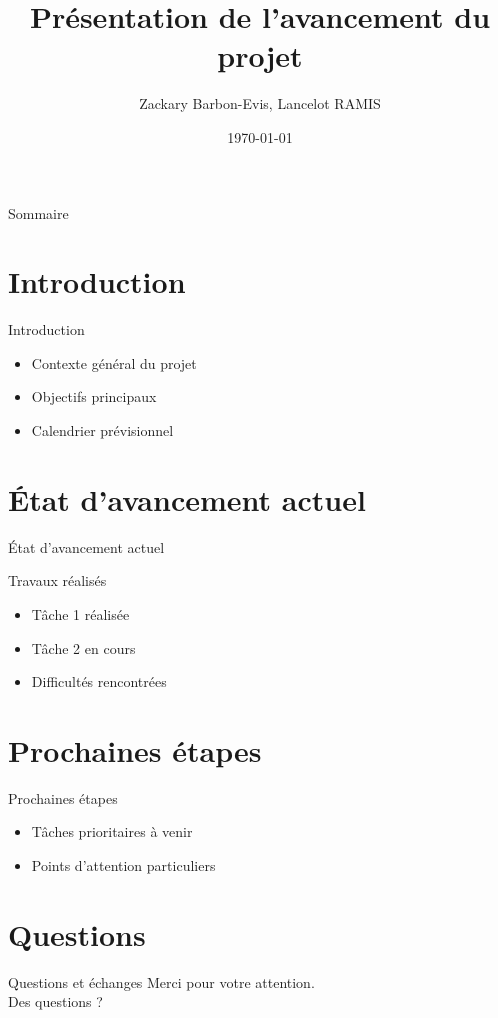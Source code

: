 \documentclass{beamer}
\title[Avancement Projet Info]{Présentation de l'avancement du projet}
\author{Zackary Barbon-Evis, Lancelot RAMIS}
\date{\today}
\begin{document}
\frame{\titlepage}

\begin{frame}{Sommaire}
    \tableofcontents
\end{frame}

\section{Introduction}

\begin{frame}{Introduction}
    \begin{itemize}
        \item Contexte général du projet
        \item Objectifs principaux
        \item Calendrier prévisionnel
    \end{itemize}
\end{frame}

\section{État d'avancement actuel}

\begin{frame}{État d'avancement actuel}
    \begin{block}{Travaux réalisés}
        \begin{itemize}
            \item Tâche 1 réalisée
            \item Tâche 2 en cours
            \item Difficultés rencontrées
        \end{itemize}
    \end{block}
\end{frame}

\section{Prochaines étapes}

\begin{frame}{Prochaines étapes}
    \begin{itemize}
        \item Tâches prioritaires à venir
        \item Points d'attention particuliers
    \end{itemize}
\end{frame}

\section{Questions}

\begin{frame}{Questions et échanges}
    \centering
    Merci pour votre attention.\\[1cm]
    Des questions ?
\end{frame}
\end{document}

